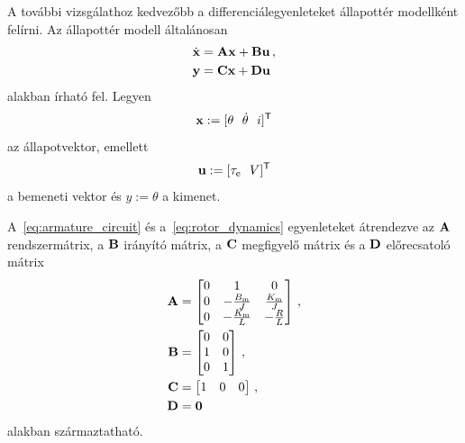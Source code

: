 A további vizsgálathoz kedvezőbb a differenciálegyenleteket állapottér modellként felírni.
Az állapottér modell általánosan~\citep{kalman1963mathematical}
\begin{equation}\label{eq:state_space_generic}
\begin{split}
    \dot{\mathbf{x}} &= \mathbf{A} \mathbf{x} + \mathbf{B} \mathbf{u}\,,\\
    \mathbf{y} &= \mathbf{C} \mathbf{x} + \mathbf{D} \mathbf{u}
\end{split}
\end{equation} 
alakban írható fel. Legyen 
\begin{equation}
	\mathbf{x} := [\theta~~\dot \theta~~i]^{\mathsf T}
\end{equation}
az állapotvektor, emellett
\begin{equation}\label{eq:uinput27}
	\mathbf{u} := [\tau_{\mathrm{e}}~~V]^{\mathsf T}
\end{equation} 
a bemeneti vektor és \(y := \theta\) a kimenet.

A~\eqref{eq:armature_circuit} és a~\eqref{eq:rotor_dynamics} egyenleteket átrendezve 
az  \(\mathbf{A}\) rendszermátrix, a \(\mathbf{B}\) irányító mátrix, a \(\mathbf{C}\) megfigyelő mátrix és a \(\mathbf{D}\) előrecsatoló mátrix
\begin{equation}\label{eq:state_space}
    \begin{split}
        \mathbf{A} &= 
        \begin{bmatrix}
            0 & 1 & 0 \\
            0 & -\frac{B_{\mathrm{m}}}{J} & \frac{K_{\mathrm{m}}}{J} \\
            0 & -\frac{K_{\mathrm{m}}}{L} & -\frac{R}{L} \\
        \end{bmatrix}\,,\\
        \mathbf{B} &=
        \begin{bmatrix}
            0 & 0 \\
            1 & 0 \\
            0 & 1 \\
        \end{bmatrix}\,,\\
        \mathbf{C} &=
        \begin{bmatrix}
            1 & 0 & 0 \\
        \end{bmatrix}\,,\\
        \mathbf{D} &= \mathbf{0}
    \end{split}
\end{equation}
alakban származtatható. 

